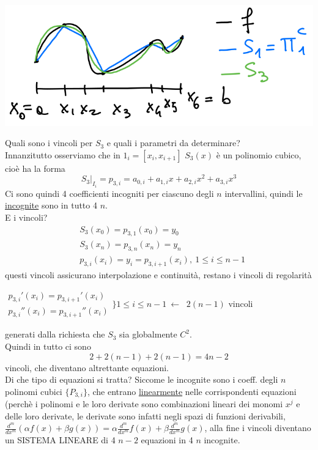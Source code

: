\documentclass[12pt,a4paper]{article}
\begin{document}
\begin{center}
    \includegraphics[scale=0.4]{img_pag23.png}
\end{center}
Quali sono i vincoli per $S_3$ e quali i parametri da determinare?\\
Innanzitutto osserviamo che in $1_i=[x_i,x_{i+1}]$ $S_3(x)$ è un polinomio cubico, cioè ha la forma 
\begin{equation*}
    S_3 \vert _{I_i} = p_{3,i} = a_{0,i} + a_{1,i}x + a_{2,i}x^2 + a_{3,i}x^3
\end{equation*}
Ci sono quindi 4 coefficienti incogniti per ciascuno degli $n$ intervallini, quindi le \uline{incognite} sono in tutto 4 $n$. \\
E i vincoli?
\begin{align*}
 & S_3(x_0)=p_{3,1}(x_0)=y_0 \\ 
 & S_3(x_n)=p_{3,n}(x_n)=y_n\\ 
 & p_{3,i}(x_i)=y_i=p_{3,i+1}(x_i), \ 1 \leq i \leq n-1 
\end{align*}
questi vincoli assicurano interpolazione e continuità, restano i vincoli di regolarità\\
\begin{center}
$\begin{matrix}
p_{3,i}'(x_i) = p_{3,i+1}'(x_i)\\
p_{3,i}''(x_i) = p_{3,i+1}''(x_i)
\end{matrix}$$\biggl\}1 \leq i \leq n-1 \ \longleftarrow \ $ $2(n-1)$ vincoli 
\end{center}
generati dalla richiesta che $S_3$ sia globalmente $C^2.$\\ 
Quindi in tutto ci sono 
\begin{equation*}
    2 + 2(n-1) + 2(n-1) = 4n-2
\end{equation*}
vincoli, che diventano altrettante equazioni.\\
Di che tipo di equazioni si tratta? Siccome le incognite sono i coeff. degli $n$ polinomi cubici $\{P_{3,i}\}$, che entrano \uline{linearmente} nelle corrispondenti equazioni (perchè i polinomi e le loro derivate sono combinazioni lineari dei monomi $x^j$ e delle loro derivate, le derivate sono infatti negli spazi di funzioni derivabili, $\frac{d^m}{dx^m}(\alpha f(x) + \beta g(x)) = \alpha \frac{d^m}{dx^m} f(x) + \beta \frac{d^m}{dx^m} g(x) $, alla fine i vincoli diventano un SISTEMA LINEARE di 4 $n-2$ equazioni in 4 $n$ incognite. \\
\end{document}
